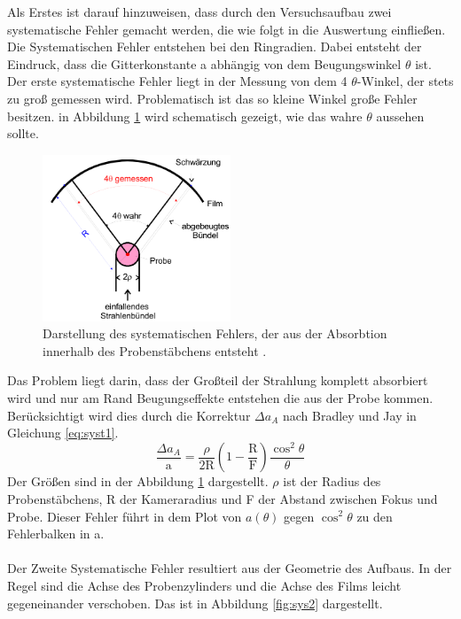 Als Erstes ist darauf hinzuweisen, dass durch den Versuchsaufbau zwei systematische Fehler gemacht werden, die wie folgt in die Auswertung einfließen.
Die Systematischen Fehler entstehen bei den Ringradien. 
Dabei entsteht der Eindruck, dass die Gitterkonstante a abhängig von dem Beugungswinkel $\theta$ ist. \\
Der erste systematische Fehler liegt in der Messung von dem 4 $\theta$-Winkel, der stets zu groß gemessen wird. 
Problematisch ist das so kleine Winkel große Fehler besitzen. 
in Abbildung \ref{fig:sys1} wird schematisch gezeigt, wie das wahre $\theta$ aussehen sollte.
\begin{figure}
\centering
	\includegraphics[width = 0.5\textwidth]{Abbildungen/Syst1.png}
	\caption{Darstellung des systematischen Fehlers, der aus der Absorbtion innerhalb des Probenstäbchens entsteht \cite{Anleitung}.}
	\label{fig:sys1}
\end{figure} 
Das Problem liegt darin, dass der Großteil der Strahlung komplett absorbiert wird und nur am Rand Beugungseffekte entstehen die aus der Probe kommen.
Berücksichtigt wird dies durch die Korrektur $\Delta a_A$ nach Bradley und Jay in Gleichung \ref{eq:syst1}.
\begin{equation}
\frac{\Delta a_A}{\text{a}} = \frac{\rho}{2\text{R}}\left( 1-\frac{\text{R}}{\text{F}} \right)\frac{\cos^2{\theta}}{\theta}
\label{eq:syst1}
\end{equation}
Der Größen sind in der Abbildung \ref{fig:sys1} dargestellt. 
$\rho$ ist der Radius des Probenstäbchens, R der Kameraradius und F der Abstand zwischen Fokus und Probe.
Dieser Fehler führt in dem Plot von $a(\theta)$ gegen $\cos^2{\theta}$ zu den Fehlerbalken in a.
\\\\
Der Zweite Systematische Fehler resultiert aus der Geometrie des Aufbaus.
In der Regel sind die Achse des Probenzylinders und die Achse des Films leicht gegeneinander verschoben. 
Das ist in Abbildung \ref{fig:sys2} dargestellt.
